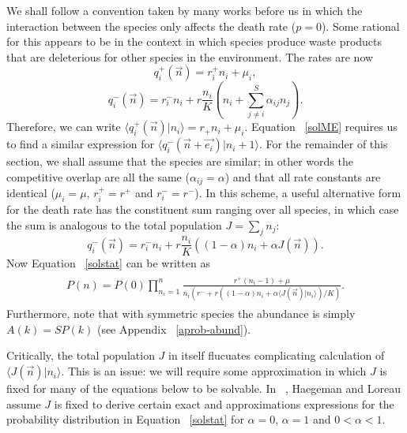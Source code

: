 \documentclass[11pt,a4paper,final]{iopart}
\begin{document}
We shall follow a convention taken by many works before us in which the interaction between the species only affects the death rate ($p=0$).
Some rational for this appears to be in the context in which species produce waste products that are deleterious for other species in the environment.
The rates are now
\begin{equation}\label{simplebirth}
q^+_i(\vec{n}) = r_i^+ n_i + \mu_i,
\end{equation}
\begin{equation*}
q^-_i(\vec{n}) = r_i^- n_i + r \frac{ n_i }{K}\left( n_i+\sum_{j\neq i}^S \alpha_{ij} n_j \right).
\end{equation*}
Therefore, we can write $\langle q^+_i(\vec{n}) | n_i \rangle = r_+ n_i + \mu_i$.
Equation ~\ref{solME} requires us to find a similar expression for $\langle q^-_i(\vec{n}+\vec{e_i}) | n_i +1 \rangle$.
For the remainder of this section, we shall assume that the species are similar; in other words the competitive overlap are all the same ($\alpha_{ij}=\alpha$) and that all rate constants are identical ($\mu_i=\mu$, $r_i^+=r^+$ and $r_i^-=r^-$).
In this scheme, a useful alternative form for the death rate has the constituent sum ranging over all species, in which case the sum is analogous to the total population $J=\sum_j n_j$:
\begin{equation}\label{simpledeath}
q^-_i(\vec{n}) = r_i^- n_i +  r \frac{ n_i }{K}\left( (1-\alpha)n_i+ \alpha J(\vec{n}) \right).
\end{equation}
Now Equation ~\ref{solstat} can be written as
\begin{align}\label{alphasol}
\begin{split}
P(n) = P(0)\prod_{n_i=1}^n \frac{r^+ (n_i-1) + \mu}{n_i\left( r^- + r \left( (1-\alpha)n_i + \alpha \langle J(\vec{n}) |n_i \rangle \right)/K \right)}.
\end{split}
\end{align}
Furthermore, note that with symmetric species the abundance is simply $A(k)=SP(k)$ (see Appendix ~\ref{aprob-abund}).

Critically, the total population $J$ in itself flucuates complicating calculation of $\langle J(\vec{n}) |n_i \rangle$.
This is an issue: we will require some approximation in which $J$ is fixed for many of the equations below to be solvable.
In ~\cite{Haegeman2011}, Haegeman and Loreau assume $J$ is fixed to derive certain exact and approximations expressions for the probability distribution in Equation ~\ref{solstat} for $\alpha=0$, $\alpha=1$ and $0 < \alpha < 1$.
\end{document}
